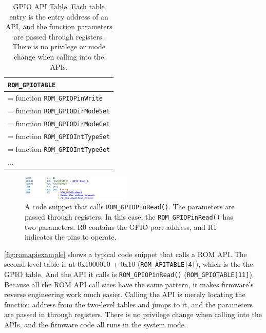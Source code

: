 \begin{center}
	\begin{table}
		\small
		\begin{tabular}{|p{7.2cm}|} 
			\hline
			\texttt{ROM\_GPIOTABLE} \\ %
			\hline
			[0] = function \texttt{ROM\_GPIOPinWrite} \\
			\hline
			[1] = function \texttt{ROM\_GPIODirModeSet} \\
			\hline
			[2] = function \texttt{ROM\_GPIODirModeGet} \\
			\hline
			[3] = function \texttt{ROM\_GPIOIntTypeSet} \\
			\hline
			[4] = function \texttt{ROM\_GPIOIntTypeGet} \\
			\hline
			... \\ 
			\hline
		\end{tabular}
		\caption{GPIO API Table. Each table entry is the entry address of an API, and the function parameters are passed through registers. There is no privilege or mode change when calling into the APIs.}
		\label{tab:gpiotable}
	\end{table}
\end{center}
%
%
\begin{figure}[tp!]
	\includegraphics[width=0.47\textwidth]{figures/romapiexample2}
	\centering
	\caption{A code snippet that calls \texttt{ROM\_GPIOPinRead()}. The parameters are passed through registers. In this case, the  \texttt{ROM\_GPIOPinRead()} has two parameters. R0 contains the GPIO port address, and R1 indicates the pins to operate.}
	\label{fig:romapiexample}
\end{figure}
%
%
%
\autoref{fig:romapiexample} shows a typical code snippet that calls a ROM API. The second-level table is at 0x1000010 + 0x10 (\texttt{ROM\_APITABLE[4]}), which is the the GPIO table. And the API it calls is \texttt{ROM\_GPIOPinRead()} (\texttt{ROM\_GPIOTABLE[11]}). Because all the ROM API call sites have the same pattern, it makes firmware's reverse engineering work much easier. Calling the API is merely locating the function address from the two-level tables and jumps to it, and the parameters are passed in through registers. There is no privilege change when calling into the APIs, and the firmware code all runs in the system mode.




